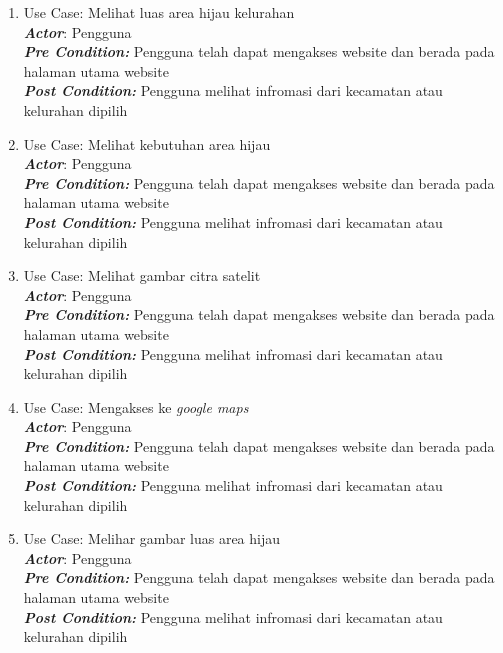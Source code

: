 \begin{enumerate}
	\item Use Case: Melihat luas area hijau kelurahan\\
	\textit{\textbf{Actor}}: Pengguna \\
	\textit{\textbf{Pre Condition: }}Pengguna telah dapat mengakses website dan berada pada halaman utama website\\
	\textit{\textbf{Post Condition:}} Pengguna melihat infromasi dari kecamatan atau kelurahan dipilih\\
	
	\item Use Case: Melihat kebutuhan area hijau\\
	\textit{\textbf{Actor}}: Pengguna \\
	\textit{\textbf{Pre Condition: }}Pengguna telah dapat mengakses website dan berada pada halaman utama website\\
	\textit{\textbf{Post Condition:}} Pengguna melihat infromasi dari kecamatan atau kelurahan dipilih\\
	
	\item Use Case: Melihat gambar citra satelit\\
	\textit{\textbf{Actor}}: Pengguna \\
	\textit{\textbf{Pre Condition: }}Pengguna telah dapat mengakses website dan berada pada halaman utama website\\
	\textit{\textbf{Post Condition:}} Pengguna melihat infromasi dari kecamatan atau kelurahan dipilih\\
	
	\item Use Case: Mengakses ke \textit{google maps}\\
	\textit{\textbf{Actor}}: Pengguna \\
	\textit{\textbf{Pre Condition: }}Pengguna telah dapat mengakses website dan berada pada halaman utama website\\
	\textit{\textbf{Post Condition:}} Pengguna melihat infromasi dari kecamatan atau kelurahan dipilih\\
	
	\item Use Case: Melihar gambar luas area hijau\\
	\textit{\textbf{Actor}}: Pengguna \\
	\textit{\textbf{Pre Condition: }}Pengguna telah dapat mengakses website dan berada pada halaman utama website\\
	\textit{\textbf{Post Condition:}} Pengguna melihat infromasi dari kecamatan atau kelurahan dipilih\\
\end{enumerate}



